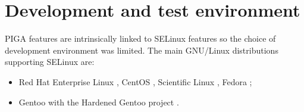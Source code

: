 \documentclass[pdftex,a4paper,titlepage,11pt]{article}
\begin{document}
%

%
%
%

\newpage

\section{Development and test environment}

PIGA features are intrinsically linked to SELinux features so the choice of
development environment was limited. The main GNU/Linux distributions supporting
SELinux are:

\begin{itemize}
	\item Red Hat Enterprise Linux \cite{rhelwebsite}, CentOS
\cite{centoswebsite}, Scientific
Linux \cite{scientificlinuxwebsite}, Fedora \cite{fedorawebsite};
	\item Gentoo \cite{gentoowebsite} with the Hardened Gentoo project
\cite{gentoohardenedproject}.
\end{itemize}
\end{document}
